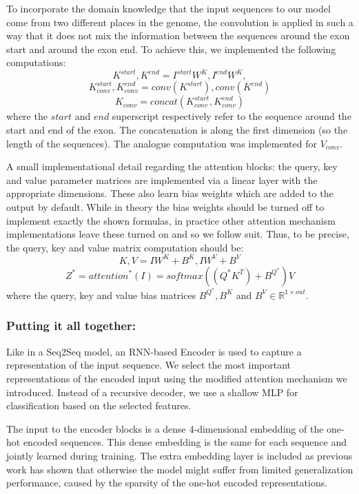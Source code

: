 To incorporate the domain knowledge that the input sequences to our model come from two different places in the genome, the convolution is applied in such a way that it does not mix the information between the sequences around the exon start and around the exon end. To achieve this, we implemented the following computations:
$$K^{start}, K^{end} = I^{start}W^K, I^{end}W^K,$$
$$K^{start}_{conv}, K^{end}_{conv} = conv(K^{start}), conv(K^{end})$$
$$K_{conv} = concat(K^{start}_{conv}, K^{end}_{conv})$$
where the $start$ and $end$ superscript respectively refer to the sequence around the start and end of the exon. The concatenation is along the first dimension (so the length of the sequences). The analogue computation was implemented for $V_{conv}$.


A small implementational detail regarding the attention blocks: the query, key and value parameter matrices are implemented via a linear layer with the appropriate dimensions. These also learn bias weights which are added to the output by default. While in theory the bias weights should be turned off to implement exactly the shown formulas, in practice other attention mechanism implementations leave these turned on \cite{annotatedtransformer} and so we follow suit. Thus, to be precise, the query, key and value matrix computation should be:
$$K, V = IW^K + B^K, IW^V + B^V$$
$$Z^* = {attention}^*(I) = softmax(({Q}^*K^T)+B^{Q^*})V$$
where the query, key and value bias matrices $B^{Q^*}, B^K$ and $B^V \in \mathbb{R}^{1 \times out}$.

\subsubsection{Putting it all together:} 
Like in a Seq2Seq model, an RNN-based Encoder is used to capture a representation of the input sequence. We select the most important representations of the encoded input using the modified attention mechanism we introduced. Instead of a recursive decoder, we use a shallow MLP for classification based on the selected features. 

The input to the encoder blocks is a dense 4-dimensional embedding of the one-hot encoded sequences. This dense embedding is the same for each sequence and jointly learned during training. The extra embedding layer is included as previous work \cite{embeddingneeded} has shown that otherwise the model might suffer from limited generalization performance, caused by the sparsity of the one-hot encoded representations. 

